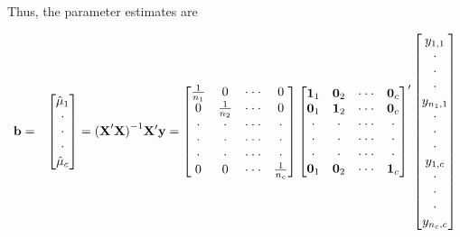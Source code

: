 Thus, the parameter estimates are

\begin{center}
\begin{eqnarray}\label{E4:OneFactorXPrimeXinvXPrimey}
\mathbf{b} &=&%
\begin{bmatrix}
\hat{\mu}_1 \\
\cdot  \\
\cdot  \\
\cdot  \\
\hat{\mu}_{c}%
\end{bmatrix}%
=\mathbf{(X}^{\prime }\mathbf{X)}^{-1}\mathbf{X}^{\prime }\mathbf{y}=%
\begin{bmatrix}
\frac{1}{n_1} & 0 & \cdot \cdot \cdot  & 0 \\
0 & \frac{1}{n_2} & \cdot \cdot \cdot  & 0 \\
\cdot  & \cdot  & \cdot \cdot \cdot  & \cdot  \\
\cdot  & \cdot  & \cdot \cdot \cdot  & \cdot  \\
\cdot  & \cdot  & \cdot \cdot \cdot  & \cdot  \\
0 & 0 & \cdot \cdot \cdot  & \frac{1}{n_c}
\end{bmatrix}
\begin{bmatrix}
\mathbf{1}_1 & \mathbf{0}_2 & \cdot \cdot \cdot  & \mathbf{0}_c \\
\mathbf{0}_1 & \mathbf{1}_2 & \cdot \cdot \cdot  & \mathbf{0}_c \\
\cdot  & \cdot  & \cdot \cdot \cdot  & \cdot  \\
\cdot  & \cdot  & \cdot \cdot \cdot  & \cdot  \\
\cdot  & \cdot  & \cdot \cdot \cdot  & \cdot  \\
\mathbf{0}_1 & \mathbf{0}_2 & \cdot \cdot \cdot  & \mathbf{1}_c%
\end{bmatrix} ^{\prime }
\begin{bmatrix}
y_{1,1} \\
\cdot  \\
\cdot  \\
\cdot  \\
y_{n_1,1} \\
\cdot  \\
\cdot  \\
\cdot  \\
y_{1,c} \\
\cdot  \\
\cdot  \\
\cdot  \\
y_{n_{c},c}%
\end{bmatrix} \notag

\end{eqnarray}
\end{center}
